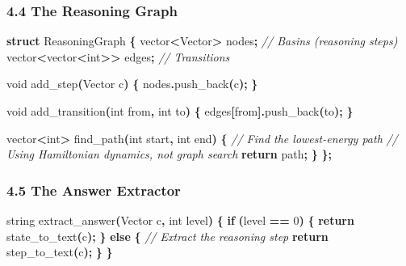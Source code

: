 \documentclass[
  11pt,
  a4paper,
]{article}
\newenvironment{Shaded}{\begin{snugshade}}{\end{snugshade}}
\newcommand{\CommentTok}[1]{\textcolor[rgb]{0.56,0.35,0.01}{\textit{#1}}}
\newcommand{\ControlFlowTok}[1]{\textcolor[rgb]{0.13,0.29,0.53}{\textbf{#1}}}
\newcommand{\DataTypeTok}[1]{\textcolor[rgb]{0.13,0.29,0.53}{#1}}
\newcommand{\DecValTok}[1]{\textcolor[rgb]{0.00,0.00,0.81}{#1}}
\newcommand{\KeywordTok}[1]{\textcolor[rgb]{0.13,0.29,0.53}{\textbf{#1}}}
\newcommand{\NormalTok}[1]{#1}
\newcommand{\OperatorTok}[1]{\textcolor[rgb]{0.81,0.36,0.00}{\textbf{#1}}}
\begin{document}
\subsubsection{4.4 The Reasoning Graph}\label{the-reasoning-graph-1}

\begin{Shaded}
\begin{Highlighting}[]
\KeywordTok{struct}\NormalTok{ ReasoningGraph }\OperatorTok{\{}
\NormalTok{    vector}\OperatorTok{\textless{}}\NormalTok{Vector}\OperatorTok{\textgreater{}}\NormalTok{ nodes}\OperatorTok{;}  \CommentTok{// Basins (reasoning steps)}
\NormalTok{    vector}\OperatorTok{\textless{}}\NormalTok{vector}\OperatorTok{\textless{}}\DataTypeTok{int}\OperatorTok{\textgreater{}\textgreater{}}\NormalTok{ edges}\OperatorTok{;}  \CommentTok{// Transitions}
    
    \DataTypeTok{void}\NormalTok{ add\_step}\OperatorTok{(}\NormalTok{Vector c}\OperatorTok{)} \OperatorTok{\{}
\NormalTok{        nodes}\OperatorTok{.}\NormalTok{push\_back}\OperatorTok{(}\NormalTok{c}\OperatorTok{);}
    \OperatorTok{\}}
    
    \DataTypeTok{void}\NormalTok{ add\_transition}\OperatorTok{(}\DataTypeTok{int}\NormalTok{ from}\OperatorTok{,} \DataTypeTok{int}\NormalTok{ to}\OperatorTok{)} \OperatorTok{\{}
\NormalTok{        edges}\OperatorTok{[}\NormalTok{from}\OperatorTok{].}\NormalTok{push\_back}\OperatorTok{(}\NormalTok{to}\OperatorTok{);}
    \OperatorTok{\}}
    
\NormalTok{    vector}\OperatorTok{\textless{}}\DataTypeTok{int}\OperatorTok{\textgreater{}}\NormalTok{ find\_path}\OperatorTok{(}\DataTypeTok{int}\NormalTok{ start}\OperatorTok{,} \DataTypeTok{int}\NormalTok{ end}\OperatorTok{)} \OperatorTok{\{}
        \CommentTok{// Find the lowest{-}energy path}
        \CommentTok{// Using Hamiltonian dynamics, not graph search}
        \ControlFlowTok{return}\NormalTok{ path}\OperatorTok{;}
    \OperatorTok{\}}
\OperatorTok{\};}
\end{Highlighting}
\end{Shaded}

\subsubsection{4.5 The Answer Extractor}\label{the-answer-extractor}

\begin{Shaded}
\begin{Highlighting}[]
\NormalTok{string extract\_answer}\OperatorTok{(}\NormalTok{Vector c}\OperatorTok{,} \DataTypeTok{int}\NormalTok{ level}\OperatorTok{)} \OperatorTok{\{}
    \ControlFlowTok{if} \OperatorTok{(}\NormalTok{level }\OperatorTok{==} \DecValTok{0}\OperatorTok{)} \OperatorTok{\{}
        \ControlFlowTok{return}\NormalTok{ state\_to\_text}\OperatorTok{(}\NormalTok{c}\OperatorTok{);}
    \OperatorTok{\}} \ControlFlowTok{else} \OperatorTok{\{}
        \CommentTok{// Extract the reasoning step}
        \ControlFlowTok{return}\NormalTok{ step\_to\_text}\OperatorTok{(}\NormalTok{c}\OperatorTok{);}
    \OperatorTok{\}}
\OperatorTok{\}}
\end{Highlighting}
\end{Shaded}
\end{document}

